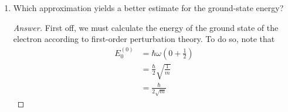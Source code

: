 \documentclass[../psets.tex]{subfiles}
\begin{document}
\begin{enumerate}
\begin{enumerate}
\begin{proof}[Answer]
            \begin{align*}
                E_\phi &= \frac{\int\phi^*\hat{H}\phi\dd{x}}{\int\phi^*\phi\dd{x}}\\
                &= \frac{\frac{7}{20}\sqrt{\frac{\pi}{\alpha^3}}+\frac{\hbar^2}{4m}\sqrt{\pi\alpha}}{\sqrt{\frac{\pi}{\alpha}}}\\
                &= \frac{7}{20\alpha}+\frac{\hbar^2\alpha}{4m}
            \end{align*}
            Differentiating, we find that
            \begin{align*}
                0 &= -\frac{7}{20\alpha^2}+\frac{\hbar^2}{4m}\\
                \frac{1}{\alpha^2} &= \frac{5\hbar^2}{7m}\\
                \alpha &= \pm\sqrt{\frac{7m}{5\hbar^2}}
            \end{align*}
            Thus, the possible values that will minimize $E_\phi$ are the $\alpha$'s given by the above. Note that $\alpha\to\pm\infty$ or $\alpha\to 0$ causes the energy to diverge, and we can ignore any negative energies because the harmonic oscillator does not have a negative energy. Plugging in, we find that $E_\phi(-\sqrt{7m/5\hbar^2})<0$, so our minimal value of energy is
            \begin{align*}
                E_\phi &= \frac{7}{20}\sqrt{\frac{5\hbar^2}{7m}}+\frac{\hbar^2}{4m}\sqrt{\frac{7m}{5\hbar^2}}\\
                &= \frac{\hbar}{4}\sqrt{\frac{7}{5m}}+\frac{\hbar}{4}\sqrt{\frac{7}{5m}}\\
                &= \frac{\hbar}{2}\sqrt{\frac{7}{5m}}\\
                \Aboxed{E_\phi &= \SI{0.5916}{\atomicunit}}
            \end{align*}
        \end{proof}
        \item Which approximation yields a better estimate for the ground-state energy?
        \begin{proof}[Answer]
            First off, we must calculate the energy of the ground state of the electron according to first-order perturbation theory. To do so, note that
            \begin{align*}
                E_0^{(0)} &= \hbar\omega\left( 0+\frac{1}{2} \right)\\
                &= \frac{\hbar}{2}\sqrt{\frac{1}{m}}\\
                &= \frac{\hbar}{2\sqrt{m}}

\end{align*}
\end{proof}
\end{enumerate}
\end{enumerate}
\end{document}
